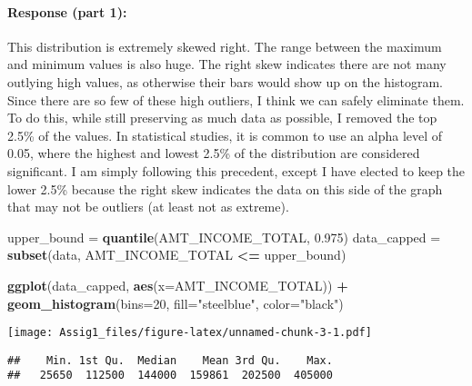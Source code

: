 \documentclass[
]{article}
\newenvironment{Shaded}{\begin{snugshade}}{\end{snugshade}}
\newcommand{\AttributeTok}[1]{\textcolor[rgb]{0.13,0.29,0.53}{#1}}
\newcommand{\DecValTok}[1]{\textcolor[rgb]{0.00,0.00,0.81}{#1}}
\newcommand{\FloatTok}[1]{\textcolor[rgb]{0.00,0.00,0.81}{#1}}
\newcommand{\FunctionTok}[1]{\textcolor[rgb]{0.13,0.29,0.53}{\textbf{#1}}}
\newcommand{\NormalTok}[1]{#1}
\newcommand{\OtherTok}[1]{\textcolor[rgb]{0.56,0.35,0.01}{#1}}
\newcommand{\SpecialCharTok}[1]{\textcolor[rgb]{0.81,0.36,0.00}{\textbf{#1}}}
\newcommand{\StringTok}[1]{\textcolor[rgb]{0.31,0.60,0.02}{#1}}
\begin{document}
\hypertarget{response-part-1}{%
\paragraph{Response (part 1):}\label{response-part-1}}

This distribution is extremely skewed right. The range between the
maximum and minimum values is also huge. The right skew indicates there
are not many outlying high values, as otherwise their bars would show up
on the histogram. Since there are so few of these high outliers, I think
we can safely eliminate them. To do this, while still preserving as much
data as possible, I removed the top 2.5\% of the values. In statistical
studies, it is common to use an alpha level of 0.05, where the highest
and lowest 2.5\% of the distribution are considered significant. I am
simply following this precedent, except I have elected to keep the lower
2.5\% because the right skew indicates the data on this side of the
graph that may not be outliers (at least not as extreme).

\begin{Shaded}
\begin{Highlighting}[]
\NormalTok{upper\_bound }\OtherTok{=} \FunctionTok{quantile}\NormalTok{(AMT\_INCOME\_TOTAL, }\FloatTok{0.975}\NormalTok{)}
\NormalTok{data\_capped }\OtherTok{=} \FunctionTok{subset}\NormalTok{(data, AMT\_INCOME\_TOTAL }\SpecialCharTok{\textless{}=}\NormalTok{ upper\_bound)}

\FunctionTok{ggplot}\NormalTok{(data\_capped, }\FunctionTok{aes}\NormalTok{(}\AttributeTok{x=}\NormalTok{AMT\_INCOME\_TOTAL)) }\SpecialCharTok{+}
  \FunctionTok{geom\_histogram}\NormalTok{(}\AttributeTok{bins=}\DecValTok{20}\NormalTok{, }\AttributeTok{fill=}\StringTok{"steelblue"}\NormalTok{, }\AttributeTok{color=}\StringTok{"black"}\NormalTok{)}
\end{Highlighting}
\end{Shaded}

\texttt{[image: Assig1\_files/figure-latex/unnamed-chunk-3-1.pdf]}

\begin{Shaded}
\end{Shaded}

\begin{verbatim}
##    Min. 1st Qu.  Median    Mean 3rd Qu.    Max. 
##   25650  112500  144000  159861  202500  405000
\end{verbatim}
\end{document}
